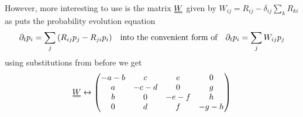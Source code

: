 \documentclass[11pt]{article}
\newcommand{\duf}[2]{\stackunder[0.5pt]{\stackunder[0.8pt]{\stackunder[1pt]{\ensuremath{#1}}{\rule{\widthof{\ensuremath{#2}}*\real{0.9}}{.1ex}}}{\rule{\widthof{\ensuremath{#2}}*\real{0.9}}{.1ex}}}{}}
\newcommand{\du}[1]{\duf{#1}{#1}}
\begin{document}
However, more interesting to use is the matrix $\du{W}$ given by $W_{ij}=R_{ij}-\delta_{ij}\sum_k R_{ki}$ as puts the probability evolution equation
\begin{equation}
    \partial_t p_i = \sum_j \qty(R_{ij}p_j - R_{ji}p_i) \qq{into the convenient form of} \partial_t p_i = \sum_j W_{ij}p_j
\end{equation}
using substitutions from before we get
\begin{equation}
    \du{W} \leftrightarrow \begin{pmatrix}
    -a-b & c & e & 0 \\
    a & -c-d & 0 & g \\
    b & 0 & -e-f & h \\
    0 & d & f & -g-h \\
    \end{pmatrix}
\end{equation}


\end{document}
